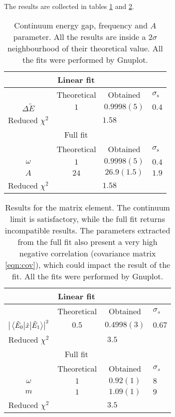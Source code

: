 The results are collected in tables \ref{tab:entab} and \ref{tab:mattab}.
\begin{table}[h!]
  \centering
\begin{tabular}{@{}cccl@{}}
\toprule
\multicolumn{3}{c}{Linear fit}                 &           \\ \midrule
                   & Theoretical & Obtained    & $\sigma_{\text{s}}$ \\
$\Delta \tilde{E}$ & $1$         & $0.9998(5)$ & $0.4$     \\
Reduced $\chi^2$   & \multicolumn{3}{c}{$1.58$}            \\ \midrule
\multicolumn{3}{c}{Full fit}                   &           \\ \midrule
                   & Theoretical & Obtained    & $\sigma_{\text{s}}$ \\
$\omega$           & $1$         & $0.9998(5)$ & $0.4$     \\
$A$                & $24$        & $26.9(1.5)$ & $1.9$     \\
Reduced $\chi^2$   & \multicolumn{3}{c}{$1.58$}            \\ \bottomrule
\end{tabular}
\caption{\label{tab:entab}Continuum energy gap, frequency and $A$ parameter. All the results are inside a $2\sigma$ neighbourhood of their theoretical value. All the fits were performed by Gnuplot.}
\end{table}

\begin{table}[h!]
  \centering
\begin{tabular}{@{}cccl@{}}
\toprule
\multicolumn{3}{c}{Linear fit}               &           \\ \midrule
                 & Theoretical & Obtained    & $\sigma_{s}$ \\
$\abs{\mel{\tilde{E}_0}{\hat{x}}{\tilde{E}_1}} ^2$          & $0.5$       & $0.4998(3)$ & $0.67$    \\
Reduced $\chi^2$ & \multicolumn{3}{c}{$3.5$}             \\ \midrule
\multicolumn{3}{c}{Full fit}                 &           \\ \midrule
                 & Theoretical & Obtained    & $\sigma_{s}$ \\
$\omega$         & $1$         & $0.92(1)$   & $8$       \\
$m$              & $1$         & $1.09(1)$   & $9$       \\
Reduced $\chi^2$ & \multicolumn{3}{c}{$3.5$}             \\ \bottomrule
\end{tabular}
\caption{\label{tab:mattab} Results for the matrix element. The continuum limit is satisfactory, while the full fit returns incompatible results. The parameters extracted from the full fit also present a very high negative correlation (covariance matrix \ref{eqn:cov}), which could impact
the result of the fit. All the fits were performed by Gnuplot.}
\end{table}
%

